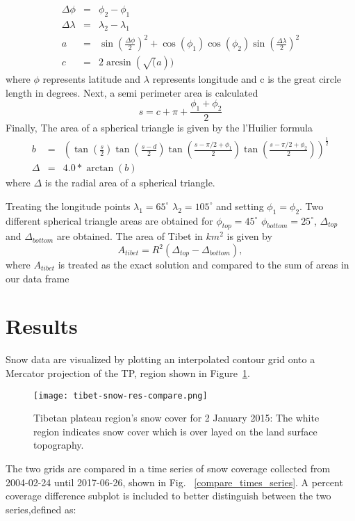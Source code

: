 \begin{eqnarray}
\Delta \phi &=& \phi_{2} - \phi_{1} \\
\Delta \lambda &=& \lambda_2- \lambda_1 \\
a &=& \sin(\frac{\Delta \phi}{2})^{2} + \cos(\phi_1)  \cos(\phi_2)  \sin(\frac{\Delta \lambda}{2})^{2} \\
c &=& 2  \arcsin(\sqrt(a))
\end{eqnarray}
where $\phi$ represents latitude and $\lambda$ represents longitude and c is the great circle length in degrees.
Next, a semi perimeter area is calculated
\begin{equation}
s = c + \pi + \frac{\phi_{1} + \phi_{2}}{2}
\end{equation}
Finally, The area of a spherical triangle is given by the l'Huilier formula
\begin{eqnarray}
b &=& \left(
\tan(\frac{s}{2})
\tan(\frac{s-d}{2})
\tan(\frac{s - \pi/2 + \phi_{1}}{2})
\tan(\frac{s - \pi/2 + \phi_{2}}{2}) \right)^{\frac{1}{2}} \\
\Delta &=& 4.0 * \arctan(b)
\end{eqnarray}
where $\Delta$ is the radial area of a spherical triangle. 

Treating the longitude points $\lambda_1 = 65^{\circ}$ $\lambda_2 = 105^{\circ}$ and setting $\phi_{1} = \phi_{2}$. Two different spherical triangle areas are obtained for $\phi_{top} = 45^{\circ}$ $\phi_{bottom} = 25^{\circ}$, $\Delta_{top}$ and $\Delta_{bottom}$ are obtained. The area of Tibet in $km^2$ is given by 
\begin{equation}
A_{tibet} = R^2(\Delta_{top} - \Delta_{bottom}),
\end{equation}
where $A_{tibet}$ is treated as the exact solution and compared to the sum of areas in our data frame

\section{Results}\label{results}
Snow data are visualized by plotting an interpolated contour grid onto a Mercator projection of the TP, region shown in Figure~\ref{compare_grids}.
\begin{figure}[ht]
\centering
\begin{minipage}{6in}
\texttt{[image: tibet-snow-res-compare.png]}
\caption{Tibetan plateau region's snow cover for 2 January 2015: The white region indicates snow cover which is over layed on the land surface topography.}
\label{compare_grids}
\end{minipage}
\end{figure}
The two grids are compared in a time series of snow coverage collected from 2004-02-24 until 2017-06-26, shown in Fig. ~\ref{compare_times_series}. A percent coverage difference subplot is included to better distinguish between the two series,defined as:

